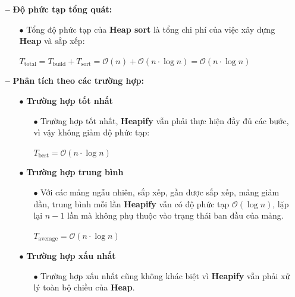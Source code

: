 \begin{itemize}
\begin{itemize}
\begin{itemize}
        \end{itemize}
    \end{itemize}
    \item [\textbf{--}] \textbf{Độ phức tạp tổng quát:}
    \begin{itemize}
        \item [$\bullet$] Tổng độ phức tạp của \textbf{Heap sort} là tổng chi phí của việc xây dựng \textbf{Heap} và sắp xếp:
        \begin{center}
            $T_{\text{total}} = T_{\text{build}} + T_{\text{sort}} = \mathcal{O}(n) + \mathcal{O}(n \cdot \log n) = \mathcal{O}(n \cdot \log n)$
        \end{center}
    \end{itemize}
    \item [\textbf{--}] \textbf{Phân tích theo các trường hợp:}
    \begin{itemize}
        \item [$\bullet$] \textbf{Trường hợp tốt nhất}
        \begin{itemize}
            \item [$\bullet$] Trường hợp tốt nhất, \textbf{Heapify} vẫn phải thực hiện đầy đủ các bước, vì vậy không giảm độ phức tạp:
            \begin{center}
                $T_{\text{best}} = \mathcal{O}(n \cdot \log n)$
            \end{center}
        \end{itemize}
        \item [$\bullet$] \textbf{Trường hợp trung bình}
        \begin{itemize}
            \item [$\bullet$] Với các mảng ngẫu nhiên, sắp xếp, gần được sắp xếp, mảng giảm dần, trung bình mỗi lần \textbf{Heapify} vẫn có độ phức tạp $\mathcal{O}(\log n)$, lặp lại $n-1$ lần mà không phụ thuộc vào trạng thái ban đầu của mảng.
            \begin{center}
                $T_{\text{average}} = \mathcal{O}(n \cdot \log n)$
            \end{center}
        \end{itemize}
        \item [$\bullet$] \textbf{Trường hợp xấu nhất}
        \begin{itemize}
            \item [$\bullet$] Trường hợp xấu nhất cũng không khác biệt vì \textbf{Heapify} vẫn phải xử lý toàn bộ chiều của \textbf{Heap}.
            \begin{center}

\end{center}
\end{itemize}
\end{itemize}
\end{itemize}
